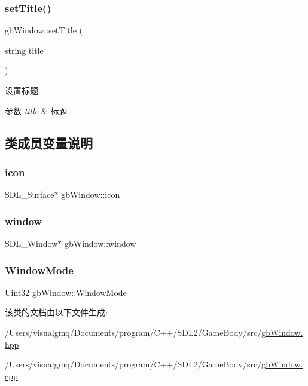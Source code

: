\subsubsection{\texorpdfstring{setTitle()}{setTitle()}}
{\footnotesize\ttfamily gb\+Window\+::set\+Title (\begin{DoxyParamCaption}\item[{string}]{title }\end{DoxyParamCaption})}



设置标题 


\begin{DoxyParams}{参数}
{\em title} & 标题 \\
\hline
\end{DoxyParams}


\subsection{类成员变量说明}
\mbox{\label{classgb_window_ad6ff49981281025fd5b027277d693e24}} 
\subsubsection{\texorpdfstring{icon}{icon}}
{\footnotesize\ttfamily S\+D\+L\+\_\+\+Surface$\ast$ gb\+Window\+::icon\hspace{0.3cm}{\ttfamily [protected]}}

\mbox{\label{classgb_window_a1faf26696f9974e05cae77fb240a502e}} 
\subsubsection{\texorpdfstring{window}{window}}
{\footnotesize\ttfamily S\+D\+L\+\_\+\+Window$\ast$ gb\+Window\+::window\hspace{0.3cm}{\ttfamily [protected]}}

\mbox{\label{classgb_window_a60b7748425bf49fdf563c870a13c6e07}} 
\subsubsection{\texorpdfstring{WindowMode}{WindowMode}}
{\footnotesize\ttfamily Uint32 gb\+Window\+::\+Window\+Mode\hspace{0.3cm}{\ttfamily [protected]}}



该类的文档由以下文件生成\+:\begin{DoxyCompactItemize}
\item 
/\+Users/visualgmq/\+Documents/program/\+C++/\+S\+D\+L2/\+Game\+Body/src/\mbox{\hyperlink{gb_window_8hpp}{gb\+Window.\+hpp}}\item 
/\+Users/visualgmq/\+Documents/program/\+C++/\+S\+D\+L2/\+Game\+Body/src/\mbox{\hyperlink{gb_window_8cpp}{gb\+Window.\+cpp}}\end{DoxyCompactItemize}
